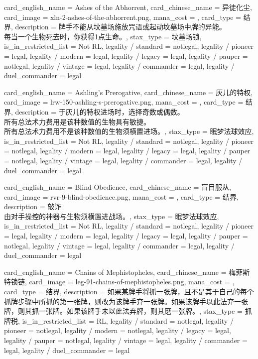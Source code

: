 \documentclass[lang = cn, color = black, 10pt]{AllThatStax}
\begin{document}
\card
{
	card_english_name = {Ashes of the Abhorrent},
	card_chinese_name = {异徒化尘},
	card_image = xln-2-ashes-of-the-abhorrent.png,
	mana_cost = ,
	card_type = 结界,
	description = {牌手不能从坟墓场施放咒语或起动坟墓场中牌的异能。\\
每当一个生物死去时，你获得1点生命。},
	stax_type = 坟墓场锁,
	is_in_restricted_list = Not RL,
	legality / standard = notlegal,
	legality / pioneer = legal,
	legality / modern = legal,
	legality / legacy = legal,
	legality / pauper = notlegal,
	legality / vintage = legal,
	legality / commander = legal,
	legality / duel_commander = legal
}

\card
{
	card_english_name = {Ashling's Prerogative},
	card_chinese_name = {灰儿的特权},
	card_image = lrw-150-ashling-s-prerogative.png,
	mana_cost = ,
	card_type = 结界,
	description = {于灰儿的特权进场时，选择奇数或偶数。 \\
所有总法术力费用是该种数值的生物具有敏捷。\\
所有总法术力费用不是该种数值的生物须横置进场。},
	stax_type = 眠梦法球效应,
	is_in_restricted_list = Not RL,
	legality / standard = notlegal,
	legality / pioneer = notlegal,
	legality / modern = legal,
	legality / legacy = legal,
	legality / pauper = notlegal,
	legality / vintage = legal,
	legality / commander = legal,
	legality / duel_commander = legal
}

\card
{
	card_english_name = {Blind Obedience},
	card_chinese_name = {盲目服从},
	card_image = rvr-9-blind-obedience.png,
	mana_cost = ,
	card_type = 结界,
	description = {敲诈\\
由对手操控的神器与生物须横置进战场。},
	stax_type = 眠梦法球效应,
	is_in_restricted_list = Not RL,
	legality / standard = notlegal,
	legality / pioneer = legal,
	legality / modern = legal,
	legality / legacy = legal,
	legality / pauper = notlegal,
	legality / vintage = legal,
	legality / commander = legal,
	legality / duel_commander = legal
}

\card
{
	card_english_name = {Chains of Mephistopheles},
	card_chinese_name = {梅菲斯特锁链},
	card_image = leg-91-chains-of-mephistopheles.png,
	mana_cost = ,
	card_type = 结界,
	description = {如果某牌手将抓一张牌，且不是其于自己的每个抓牌步骤中所抓的第一张牌，则改为该牌手弃一张牌。如果该牌手以此法弃一张牌，则其抓一张牌。如果该牌手未以此法弃牌，则其磨一张牌。},
	stax_type = 抓牌税,
	is_in_restricted_list = RL,
	legality / standard = notlegal,
	legality / pioneer = notlegal,
	legality / modern = notlegal,
	legality / legacy = legal,
	legality / pauper = notlegal,
	legality / vintage = legal,
	legality / commander = legal,
	legality / duel_commander = legal
}
\end{document}

